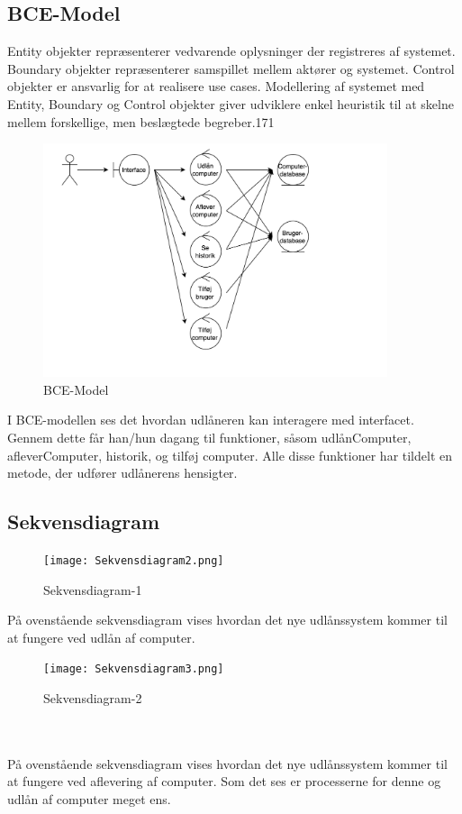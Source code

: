 \documentclass[a4paper]{article}
\begin{document}
\subsection{BCE-Model}
Entity objekter repræsenterer vedvarende oplysninger der registreres af systemet. Boundary objekter repræsenterer samspillet mellem aktører og systemet. Control objekter er ansvarlig for at realisere use cases. Modellering af systemet med Entity, Boundary og Control objekter giver udviklere enkel heuristik til at skelne mellem forskellige, men beslægtede begreber.\cite{OOSE}{171}
\begin{figure}[h!]
\includegraphics[width=0.9\textwidth]{BCE.png}
  \caption{BCE-Model}
  \centering
\end{figure}
I BCE-modellen ses det hvordan udlåneren kan interagere med interfacet. Gennem dette får han/hun dagang til funktioner, såsom udlånComputer, afleverComputer, historik, og tilføj computer. Alle disse funktioner har tildelt en metode, der udfører udlånerens hensigter.\\
\newpage
\subsection{Sekvensdiagram}
\begin{figure}[h!]
\texttt{[image: Sekvensdiagram2.png]}
  \caption{Sekvensdiagram-1}
  \centering
\end{figure}
På ovenstående sekvensdiagram vises hvordan det nye udlånssystem kommer til at fungere ved udlån af computer. \\
\begin{figure}[h!]
\texttt{[image: Sekvensdiagram3.png]}
  \caption{Sekvensdiagram-2}
  \centering
\end{figure} \\ \\
På ovenstående sekvensdiagram vises hvordan det nye udlånssystem kommer til at fungere ved aflevering af computer. Som det ses er processerne for denne og udlån af computer meget ens.
\newpage
\end{document}
